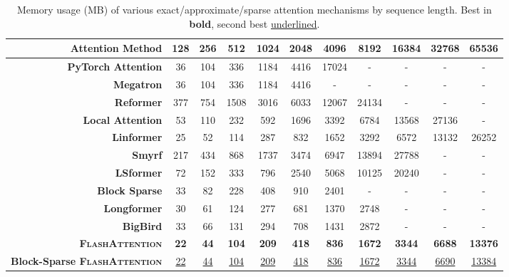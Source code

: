 \documentclass{article}
\newcommand{\sysname}{\textsc{FlashAttention}\xspace}
\begin{document}
\begin{table}
\centering
\scriptsize
\captionsetup{font=small}
\caption{Memory usage (MB) of various exact/approximate/sparse attention mechanisms by sequence length. Best in \textbf{bold}, second best \underline{underlined}.}
\begin{tabular}{@{}r|cccccccccc@{}}
\toprule
\textbf{Attention Method} & 128 & 256 & 512 & 1024 & 2048 & 4096 & 8192 & 16384 & 32768 & 65536 \\
\hline
\textbf{PyTorch Attention} & 36 & 104 & 336 & 1184 & 4416 & 17024 & - & - & - & - \\
\textbf{Megatron} & 36 & 104 & 336 & 1184 & 4416 & - & - & - & - & - \\
\hline
\textbf{Reformer} & 377 & 754 & 1508 & 3016 & 6033 & 12067 & 24134 & - & - & - \\
\textbf{Local Attention} & 53 & 110 & 232 & 592 & 1696 & 3392 & 6784 & 13568 & 27136 & - \\
\textbf{Linformer} & 25 & 52 & 114 & 287 & 832 & 1652 & 3292 & 6572 & 13132 & 26252 \\
\textbf{Smyrf} & 217 & 434 & 868 & 1737 & 3474 & 6947 & 13894 & 27788 & - & - \\
\textbf{LSformer} & 72 & 152 & 333 & 796 & 2540 & 5068 & 10125 & 20240 & - & - \\
\hline
\textbf{Block Sparse} & 33 & 82 & 228 & 408 & 910 & 2401 & - & - & - & - \\
\textbf{Longformer} & 30 & 61 & 124 & 277 & 681 & 1370 & 2748 & - & - & - \\
\textbf{BigBird} & 33 & 66 & 131 & 294 & 708 & 1431 & 2872 & - & - & - \\
\hline
\textbf{\sysname} & \textbf{22} & \textbf{44} & \textbf{104} & \textbf{209} & \textbf{418} & \textbf{836} & \textbf{1672} & \textbf{3344} & \textbf{6688} & \textbf{13376} \\
\textbf{Block-Sparse \sysname} & \underline{22} & \underline{44} & \underline{104} & \underline{209} & \underline{418} & \underline{836} & \underline{1672} & \underline{3344} & \underline{6690} & \underline{13384} \\
\bottomrule
\end{tabular}
\label{tab:memory}
\end{table}

\appendix
\newpage
\end{document}
